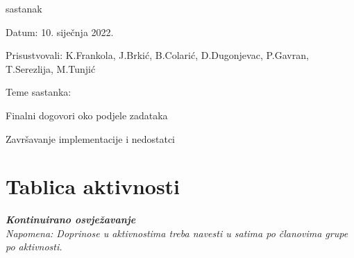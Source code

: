 \begin{packed_enum}
						\item  sastanak
\item[] \begin{packed_item}
	\item Datum: 10. siječnja 2022.
	\item Prisustvovali: K.Frankola, J.Brkić, B.Colarić, D.Dugonjevac, P.Gavran, T.Serezlija, M.Tunjić
	\item Teme sastanka:
	\begin{packed_item}
		\item  Finalni dogovori oko podjele zadataka
		\item  Završavanje implementacije i nedostatci
	\end{packed_item}
\end{packed_item}
			
			
		\end{packed_enum}
		
		\eject
		\section*{Tablica aktivnosti}
		
			\textbf{\textit{Kontinuirano osvježavanje}}\\
			
			 \textit{Napomena: Doprinose u aktivnostima treba navesti u satima po članovima grupe po aktivnosti.}

